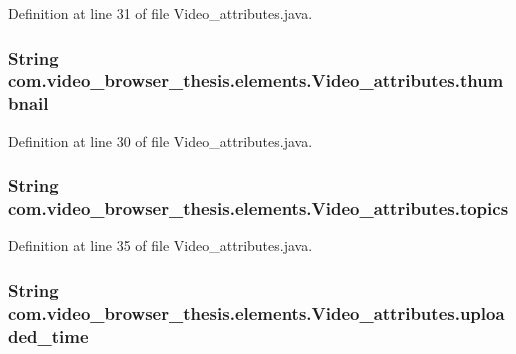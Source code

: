 Definition at line 31 of file Video\-\_\-attributes.\-java.

\hypertarget{classcom_1_1video__browser__thesis_1_1elements_1_1_video__attributes_ae602e9e2f3ec0641635063eeecdef8c0}{
\subsubsection[{thumbnail}]{\setlength{\rightskip}{0pt plus 5cm}String com.\-video\-\_\-browser\-\_\-thesis.\-elements.\-Video\-\_\-attributes.\-thumbnail}}\label{classcom_1_1video__browser__thesis_1_1elements_1_1_video__attributes_ae602e9e2f3ec0641635063eeecdef8c0}


Definition at line 30 of file Video\-\_\-attributes.\-java.

\hypertarget{classcom_1_1video__browser__thesis_1_1elements_1_1_video__attributes_ae38e2927f054bedae6fd00d5a6d89332}{
\subsubsection[{topics}]{\setlength{\rightskip}{0pt plus 5cm}String com.\-video\-\_\-browser\-\_\-thesis.\-elements.\-Video\-\_\-attributes.\-topics}}\label{classcom_1_1video__browser__thesis_1_1elements_1_1_video__attributes_ae38e2927f054bedae6fd00d5a6d89332}


Definition at line 35 of file Video\-\_\-attributes.\-java.

\hypertarget{classcom_1_1video__browser__thesis_1_1elements_1_1_video__attributes_ab249aab820838b9cce924dcf2e684e30}{
\subsubsection[{uploaded\-\_\-time}]{\setlength{\rightskip}{0pt plus 5cm}String com.\-video\-\_\-browser\-\_\-thesis.\-elements.\-Video\-\_\-attributes.\-uploaded\-\_\-time}}\label{classcom_1_1video__browser__thesis_1_1elements_1_1_video__attributes_ab249aab820838b9cce924dcf2e684e30}


